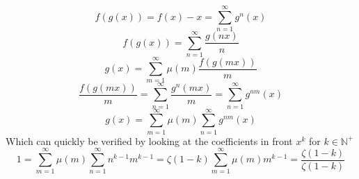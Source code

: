 \documentclass[a4paper]{article}
\begin{document}
$$f(g(x)) = f(x) - x = \sum_{n=1}^{\infty} g^n(x)$$
$$f(g(x)) = \sum_{n=1}^{\infty} \frac{g(n x)}{n}$$
$$g(x) = \sum_{m=1}^{\infty} \mu(m) \frac{f(g(m x))}{m}$$
$$\frac{f(g(m x))}{m} = \sum_{n=1}^{\infty} \frac{g^n(m x)}{m} = \sum_{n=1}^{\infty} g^{n m}(x)$$
$$g(x) = \sum_{m=1}^{\infty} \mu(m) \sum_{n=1}^{\infty} g^{n m}(x)$$
Which can quickly be verified by looking at the coefficients in front $x^k$ for $k \in \mathbb{N}^+$
$$1 = \sum_{m=1}^{\infty} \mu(m) \sum_{n=1}^{\infty} n^{k-1} m^{k-1} = \zeta(1-k) \sum_{m=1}^{\infty} \mu(m) m^{k-1} = \frac{\zeta(1-k)}{\zeta(1-k)}$$
\end{document}
